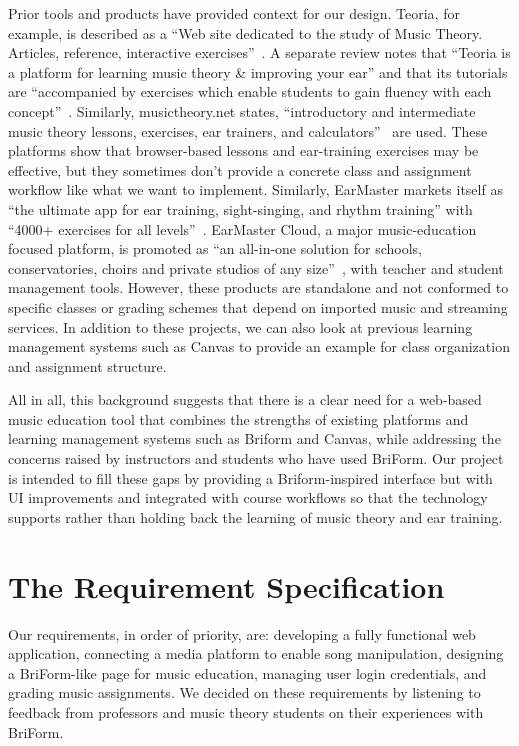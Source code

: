 \documentclass[12pt, letterpaper]{article}
\begin{document}
Prior tools and products have provided context for our design. Teoria, for example, is described as a ``Web site dedicated to the study of Music Theory. Articles, reference, interactive exercises''~\cite{teoria-main}. A separate review notes that ``Teoria is a platform for learning music theory \& improving your ear'' and that its tutorials are ``accompanied by exercises which enable students to gain fluency with each concept''~\cite{teoria-review}. Similarly, musictheory.net states, ``introductory and intermediate music theory lessons, exercises, ear trainers, and calculators''~\cite{musictheory-main} are used. These platforms show that browser-based lessons and ear-training exercises may be effective, but they sometimes don't provide a concrete class and assignment workflow like what we want to implement. Similarly, EarMaster markets itself as ``the ultimate app for ear training, sight-singing, and rhythm training'' with ``4000+ exercises for all levels''~\cite{earmaster-main}. EarMaster Cloud, a major music-education focused platform, is promoted as ``an all-in-one solution for schools, conservatories, choirs and private studios of any size''~\cite{earmaster-cloud}, with teacher and student management tools. However, these products are standalone and not conformed to specific classes or grading schemes that depend on imported music and streaming services. In addition to these projects, we can also look at previous learning management systems such as Canvas to provide an example for class organization and assignment structure.

All in all, this background suggests that there is a clear need for a web-based music education tool that combines the strengths of existing platforms and learning management systems such as Briform and Canvas, while addressing the concerns raised by instructors and students who have used BriForm. Our project is intended to fill these gaps by providing a Briform-inspired interface but with UI improvements and integrated with course workflows so that the technology supports rather than holding back the learning of music theory and ear training.

\section*{The Requirement Specification}
Our requirements, in order of priority, are: developing a fully functional web application, connecting a media platform to enable song manipulation, designing a BriForm-like page for music education, managing user login credentials, and grading music assignments. We decided on these requirements by listening to feedback from professors and music theory students on their experiences with BriForm.
\end{document}
